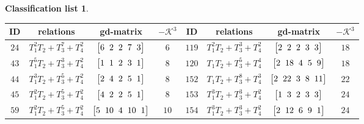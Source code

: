 \documentclass[10pt,a4paper]{amsart}
\theoremstyle{definition}
\newtheorem{class-list}[thm]{Classification list}
\numberwithin{equation}{section}
\begin{document}
\begin{class-list}
\begin{table}[t!]\centering\setlength{\tabcolsep}{3.5pt}
\renewcommand{\arraystretch}{1.3}\small\tabulinesep=1mm
\begin{tabu}{c|c|c|c||c|c|c|c}
\hline
ID&relations&gd-matrix&$-\mathcal{K}^3$&ID&relations&gd-matrix&$-\mathcal{K}^3$
\\
\hline
${24}$&${T_{1}^{2}T_{2}+T_{3}^{7}+T_{4}^{2}}$
&$\arraycolsep=1mm\begin{bmatrix}{6} & {2} & {2} & {7} & {3}\end{bmatrix}$&${6}$
&${119}$&${T_{1}^{2}T_{2}+T_{3}^{3}+T_{4}^{2}}$
&$\arraycolsep=1mm\begin{bmatrix}{2} & {2} & {2} & {3} & {3}\end{bmatrix}$&${18}$
\\
\hline
${43}$&${T_{1}^{5}T_{2}+T_{3}^{3}+T_{4}^{2}}$
&$\arraycolsep=1mm\begin{bmatrix}{1} & {1} & {2} & {3} & {1}\end{bmatrix}$&${8}$
&${120}$&${T_{1}T_{2}+T_{3}^{5}+T_{4}^{4}}$
&$\arraycolsep=1mm\begin{bmatrix}{2} & {18} & {4} & {5} & {9}\end{bmatrix}$&${18}$
\\
\hline
${44}$&${T_{1}^{3}T_{2}+T_{3}^{5}+T_{4}^{2}}$
&$\arraycolsep=1mm\begin{bmatrix}{2} & {4} & {2} & {5} & {1}\end{bmatrix}$&${8}$
&${152}$&${T_{1}T_{2}+T_{3}^{8}+T_{4}^{3}}$
&$\arraycolsep=1mm\begin{bmatrix}{2} & {22} & {3} & {8} & {11}\end{bmatrix}$&${22}$
\\
\hline
${45}$&${T_{1}^{2}T_{2}+T_{3}^{5}+T_{4}^{2}}$
&$\arraycolsep=1mm\begin{bmatrix}{4} & {2} & {2} & {5} & {1}\end{bmatrix}$&${8}$
&${153}$&${T_{1}^{3}T_{2}+T_{3}^{3}+T_{4}^{2}}$
&$\arraycolsep=1mm\begin{bmatrix}{1} & {3} & {2} & {3} & {3}\end{bmatrix}$&${24}$
\\
\hline
${59}$&${T_{1}^{2}T_{2}+T_{3}^{5}+T_{4}^{2}}$
&$\arraycolsep=1mm\begin{bmatrix}{5} & {10} & {4} & {10} & {1}\end{bmatrix}$&${10}$
&${154}$&${T_{1}^{3}T_{2}+T_{3}^{3}+T_{4}^{2}}$
&$\arraycolsep=1mm\begin{bmatrix}{2} & {12} & {6} & {9} & {1}\end{bmatrix}$&${24}$

\end{tabu}
\end{table}
\end{class-list}
\end{document}
